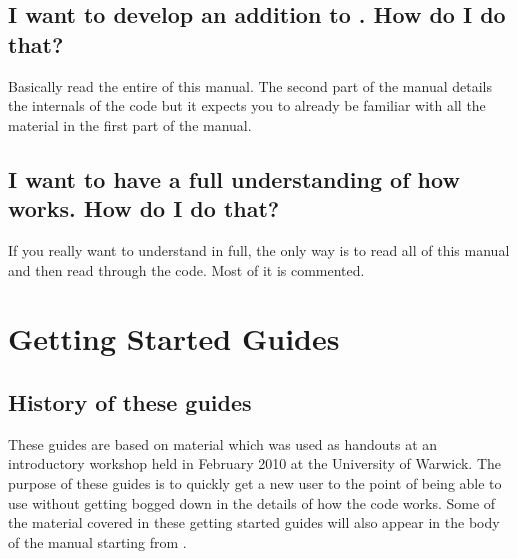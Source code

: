 \subsection{I want to develop an addition to {\EPOCH}. How do I do that?}
Basically read the entire of this manual. The second part of the manual details
the internals of the code but it expects you to already be familiar with all
the material in the first part of the manual.

\subsection{I want to have a full understanding of how {\EPOCH} works. How do I
  do that?}
If you really want to understand {\EPOCH}
in full, the only way is to read all of
this manual and then read through the code. Most of it is commented.
\pagebreak

\section{Getting Started Guides}
\label{sec:gettingstarted}

\subsection{History of these guides}
These guides are based on material which was used as handouts at an {\EPOCH}
introductory workshop held in February 2010 at the University of Warwick. The
purpose of these guides is to quickly get a new user to the point of being able
to use {\EPOCH} without getting bogged down in the details of how the code
works. Some of the material covered in these getting started guides will also
appear in the body of the manual starting from .

